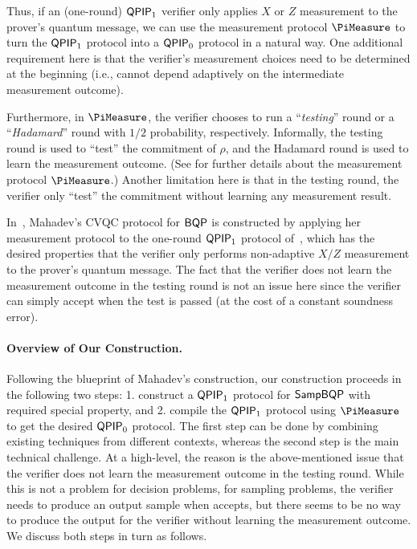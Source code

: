 Thus, if an (one-round) $\operatorname{\mathsf{QPIP}}_1$ verifier only applies $X$ or $Z$ measurement to the prover's quantum message, we can use the measurement protocol $\PiMeasure$ to turn the $\operatorname{\mathsf{QPIP}}_1$ protocol into a $\operatorname{\mathsf{QPIP}}_0$ protocol in a natural way. One additional requirement here is that the verifier's measurement choices need to be determined at the beginning (i.e., cannot depend adaptively on the intermediate measurement outcome). 

Furthermore, in $\PiMeasure$, the verifier chooses to run a ``\emph{testing}'' round or a ``\emph{Hadamard}'' round with $1/2$ probability, respectively. Informally, the testing round is used to ``test'' the commitment of $\rho$, and the Hadamard round is used to learn the measurement outcome. (See  for further details about the measurement protocol $\PiMeasure$.) Another limitation here is that in the testing round, the verifier only ``test'' the commitment without learning any measurement result. 

In~\cite{FOCS:Mahadev18a}, Mahadev's CVQC protocol for $\operatorname{\mathsf{BQP}}$ is constructed by applying her measurement protocol to the one-round $\operatorname{\mathsf{QPIP}}_1$ protocol of~\cite{PhysRevA.93.022326, mf16}, which has the desired properties that the verifier only performs non-adaptive $X/Z$ measurement to the prover's quantum message. The fact that the verifier does not learn the measurement outcome in the testing round is not an issue here since the verifier can simply accept when the test is passed (at the cost of a constant soundness error).

\paragraph{Overview of Our Construction.}
Following the blueprint of Mahadev's construction, our construction proceeds in the following two steps: 1. construct a $\operatorname{\mathsf{QPIP}}_1$ protocol for $\operatorname{\mathsf{SampBQP}}$ with required special property, and 2. compile the $\operatorname{\mathsf{QPIP}}_1$ protocol using $\PiMeasure$ to get the desired $\operatorname{\mathsf{QPIP}}_0$ protocol. The first step can be done by combining existing techniques from different contexts, whereas the second step is the main technical challenge.
At a high-level, the reason is the above-mentioned issue that the verifier does not learn the measurement outcome in the testing round. While this is not a problem for decision problems, %
for sampling problems, the verifier needs to produce an output sample when accepts, but there seems to be no way to produce the output for the verifier without learning the measurement outcome.   
%
We discuss both steps in turn as follows.

